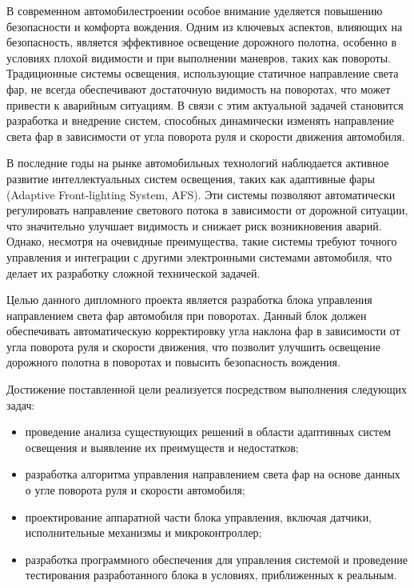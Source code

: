 
В современном автомобилестроении особое внимание уделяется повышению безопасности и комфорта вождения. Одним из ключевых аспектов, влияющих на безопасность, является эффективное освещение дорожного полотна, особенно в условиях плохой видимости и при выполнении маневров, таких как повороты. Традиционные системы освещения, использующие статичное направление света фар, не всегда обеспечивают достаточную видимость на поворотах, что может привести к аварийным ситуациям. В связи с этим актуальной задачей становится разработка и внедрение систем, способных динамически изменять направление света фар в зависимости от угла поворота руля и скорости движения автомобиля.

В последние годы на рынке автомобильных технологий наблюдается активное развитие интеллектуальных систем освещения, таких как адаптивные фары (Adaptive Front-lighting System, AFS). Эти системы позволяют автоматически регулировать направление светового потока в зависимости от дорожной ситуации, что значительно улучшает видимость и снижает риск возникновения аварий. Однако, несмотря на очевидные преимущества, такие системы требуют точного управления и интеграции с другими электронными системами автомобиля, что делает их разработку сложной технической задачей.

Целью данного дипломного проекта является разработка блока управления направлением света фар автомобиля при поворотах. Данный блок должен обеспечивать автоматическую корректировку угла наклона фар в зависимости от угла поворота руля и скорости движения, что позволит улучшить освещение дорожного полотна в поворотах и повысить безопасность вождения.

Достижение поставленной цели реализуется посредством выполнения следующих задач:
\begin{itemize}
    \item проведение анализа существующих решений в области адаптивных систем освещения и выявление их преимуществ и недостатков;
    \item разработка алгоритма управления направлением света фар на основе данных о угле поворота руля и скорости автомобиля;
    \item проектирование аппаратной части блока управления, включая датчики, исполнительные механизмы и микроконтроллер;
    \item разработка программного обеспечения для управления системой и проведение тестирования разработанного блока в условиях, приближенных к реальным.
\end{itemize}

